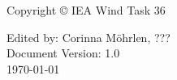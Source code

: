 \thispagestyle{empty}
{\small
\strut\vfill %
\noindent Copyright \copyright{} IEA Wind Task 36\par
\vspace{0.2cm}
\noindent Edited by: Corinna Möhrlen, ???\\
Document Version: 1.0\\
\today
}
\clearpage